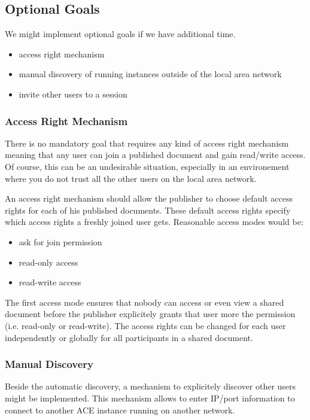 \documentclass[11pt,a4paper]{article}
\begin{document}
\subsection{Optional Goals}

We might implement optional goals if we have additional time.

\begin{itemize}
 \item access right mechanism
 \item manual discovery of running instances outside of the local area network
 \item invite other users to a session 
\end{itemize}

\subsubsection{Access Right Mechanism}

There is no mandatory goal that requires any kind of access right mechanism 
meaning that any user can join a published document and gain read/write 
access. Of course, this can be an undesirable situation, especially in an 
environement where you do not trust all the other users on the local 
area network.

An access right mechanism should allow the publisher to choose default access 
rights for each of his published documents. These default access rights 
specify which access rights a freshly joined user gets. Reasonable access 
modes would be:

\begin{itemize}
 \item ask for join permission
 \item read-only access
 \item read-write access
\end{itemize}

The first access mode ensures that nobody can access or even view a shared 
document before the publisher explicitely grants that user more the permission
(i.e. read-only or read-write). The access rights can be changed for each 
user independently or globally for all participants in a shared document.

\subsubsection{Manual Discovery}

Beside the automatic discovery, a mechanism to explicitely discover other users
might be implemented. This mechanism allows to enter IP/port information to
connect to another ACE instance running on another network.
\end{document}
